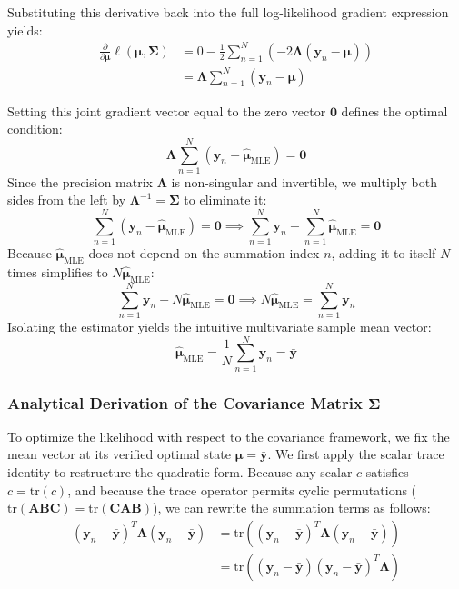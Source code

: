 \documentclass{article}
\begin{document}
Substituting this derivative back into the full log-likelihood gradient expression yields:
\begin{align*}
\frac{\partial}{\partial \boldsymbol{\mu}} \ell(\boldsymbol{\mu}, \boldsymbol{\Sigma}) &= 0 - \frac{1}{2} \sum_{n=1}^N \left( -2\boldsymbol{\Lambda}(\mathbf{y}_n - \boldsymbol{\mu}) \right) \\
&= \boldsymbol{\Lambda} \sum_{n=1}^N (\mathbf{y}_n - \boldsymbol{\mu})
\end{align*}

Setting this joint gradient vector equal to the zero vector $\mathbf{0}$ defines the optimal condition:
\begin{equation}
\boldsymbol{\Lambda} \sum_{n=1}^N (\mathbf{y}_n - \hat{\boldsymbol{\mu}}_{\text{MLE}}) = \mathbf{0}
\end{equation}
Since the precision matrix $\boldsymbol{\Lambda}$ is non-singular and invertible, we multiply both sides from the left by $\boldsymbol{\Lambda}^{-1} = \boldsymbol{\Sigma}$ to eliminate it:
\begin{equation}
\sum_{n=1}^N (\mathbf{y}_n - \hat{\boldsymbol{\mu}}_{\text{MLE}}) = \mathbf{0} \implies \sum_{n=1}^N \mathbf{y}_n - \sum_{n=1}^N \hat{\boldsymbol{\mu}}_{\text{MLE}} = \mathbf{0}
\end{equation}
Because $\hat{\boldsymbol{\mu}}_{\text{MLE}}$ does not depend on the summation index $n$, adding it to itself $N$ times simplifies to $N\hat{\boldsymbol{\mu}}_{\text{MLE}}$:
\begin{equation}
\sum_{n=1}^N \mathbf{y}_n - N\hat{\boldsymbol{\mu}}_{\text{MLE}} = \mathbf{0} \implies N\hat{\boldsymbol{\mu}}_{\text{MLE}} = \sum_{n=1}^N \mathbf{y}_n
\end{equation}
Isolating the estimator yields the intuitive multivariate sample mean vector:
\begin{equation}
\hat{\boldsymbol{\mu}}_{\text{MLE}} = \frac{1}{N}\sum_{n=1}^N \mathbf{y}_n = \bar{\mathbf{y}}
\end{equation}

\subsubsection{Analytical Derivation of the Covariance Matrix $\boldsymbol{\Sigma}$}

To optimize the likelihood with respect to the covariance framework, we fix the mean vector at its verified optimal state $\boldsymbol{\mu} = \bar{\mathbf{y}}$. We first apply the scalar trace identity to restructure the quadratic form. Because any scalar $c$ satisfies $c = \text{tr}(c)$, and because the trace operator permits cyclic permutations ($\text{tr}(\mathbf{A}\mathbf{B}\mathbf{C}) = \text{tr}(\mathbf{C}\mathbf{A}\mathbf{B})$), we can rewrite the summation terms as follows:
\begin{align*}
(\mathbf{y}_n - \bar{\mathbf{y}})^T \boldsymbol{\Lambda} (\mathbf{y}_n - \bar{\mathbf{y}}) &= \text{tr}\left( (\mathbf{y}_n - \bar{\mathbf{y}})^T \boldsymbol{\Lambda} (\mathbf{y}_n - \bar{\mathbf{y}}) \right) \\
&= \text{tr}\left( (\mathbf{y}_n - \bar{\mathbf{y}})(\mathbf{y}_n - \bar{\mathbf{y}})^T \boldsymbol{\Lambda} \right)
\end{align*}
\end{document}
